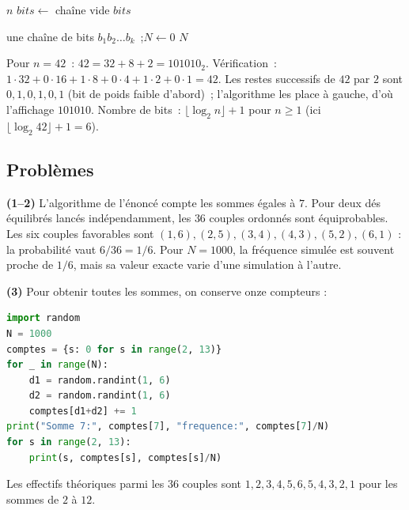 
\begin{algorithm}[H]
\caption{D\'ecimal vers binaire}
\Lire $n$\;
$\mathit{bits} \leftarrow$ cha\^ine vide\;
\Afficher $\mathit{bits}$\;
\end{algorithm}

\begin{algorithm}[H]
\caption{Binaire vers d\'ecimal}
\Lire une cha\^ine de bits $b_1b_2\ldots b_k$~;\quad $N \leftarrow 0$\;
\Afficher $N$\;
\end{algorithm}

Pour $n=42$~: $42=32+8+2=101010_2$.
V\'erification~: $1\cdot32+0\cdot16+1\cdot8+0\cdot4+1\cdot2+0\cdot1=42$.\checkmark
Les restes successifs de $42$ par $2$ sont $0,1,0,1,0,1$ (bit de poids faible d'abord)~; l'algorithme les place \`a gauche, d'o\`u l'affichage $101010$.
Nombre de bits~: $\lfloor\log_2n\rfloor+1$ pour $n\ge1$ (ici $\lfloor\log_2 42\rfloor+1=6$).

\subsection*{Probl\`emes}


\textbf{(1--2)} L'algorithme de l'\'enonc\'e compte les sommes \'egales \`a $7$.
Pour deux d\'es \'equilibr\'es lanc\'es ind\'ependamment, les $36$ couples ordonn\'es
sont \'equiprobables. Les six couples favorables sont
$(1,6),(2,5),(3,4),(4,3),(5,2),(6,1)$ : la probabilit\'e vaut $6/36=1/6$.
Pour $N=1000$, la fr\'equence simul\'ee est souvent proche de $1/6$,
mais sa valeur exacte varie d'une simulation \`a l'autre.

\textbf{(3)} Pour obtenir toutes les sommes, on conserve onze compteurs :
\begin{lstlisting}[language=Python]
import random
N = 1000
comptes = {s: 0 for s in range(2, 13)}
for _ in range(N):
    d1 = random.randint(1, 6)
    d2 = random.randint(1, 6)
    comptes[d1+d2] += 1
print("Somme 7:", comptes[7], "frequence:", comptes[7]/N)
for s in range(2, 13):
    print(s, comptes[s], comptes[s]/N)
\end{lstlisting}
Les effectifs th\'eoriques parmi les $36$ couples sont
$1,2,3,4,5,6,5,4,3,2,1$ pour les sommes de $2$ \`a $12$.


